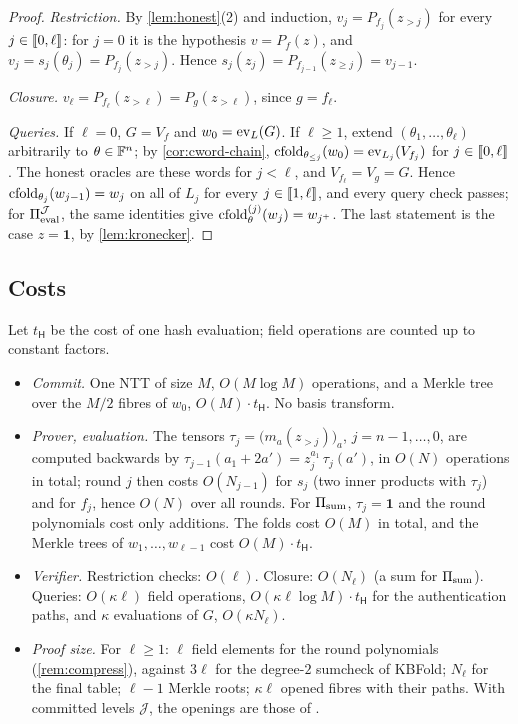 \begin{proof}
\emph{Restriction.} By \cref{lem:honest}(2) and induction, $v_j = P_{f_j}(z_{>j})$ for every $j \in \llbracket 0, \ell \rrbracket$: for $j = 0$ it is the hypothesis $v = P_f(z)$, and $v_j = s_j(\theta_j) = P_{f_j}(z_{>j})$. Hence $s_j(z_j) = P_{f_{j-1}}(z_{\ge j}) = v_{j-1}$.

\emph{Closure.} $v_\ell = P_{f_\ell}(z_{>\ell}) = P_g(z_{>\ell})$, since $g = f_\ell$.

\emph{Queries.} If $\ell = 0$, $G = V_f$ and $w_0 = \mathrm{ev}_L(G)$.
If $\ell \ge 1$, extend $(\theta_1,\dots,\theta_\ell)$ arbitrarily to $\theta \in \mathbb{F}^n$; by \cref{cor:cword-chain}, $\mathrm{cfold}_{\theta_{\le j}}(w_0) = \mathrm{ev}_{L_j}(V_{f_j})$ for $j \in \llbracket 0, \ell \rrbracket$.
The honest oracles are these words for $j < \ell$, and $V_{f_\ell} = V_g = G$.
Hence $\mathrm{cfold}_{\theta_j}(w_{j-1}) = w_j$ on all of $L_j$ for every $j \in \llbracket 1, \ell \rrbracket$, and every query check passes; for $\Pi_{\mathrm{eval}}^{\mathcal{J}}$, the same identities give $\mathrm{cfold}^{(j)}_\theta(w_j) = w_{j^+}$.
The last statement is the case $z = \mathbf 1$, by \cref{lem:kronecker}.
\end{proof}

\subsection{Costs}\label{sec:scheme:costs}

Let $t_{\mathsf{H}}$ be the cost of one hash evaluation; field operations are counted up to constant factors.

\begin{itemize}
  \item \emph{Commit.} One NTT of size $M$, $O(M \log M)$ operations, and a Merkle tree over the $M/2$ fibres of $w_0$, $O(M) \cdot t_{\mathsf{H}}$. No basis transform.
  \item \emph{Prover, evaluation.} The tensors $\tau_j = \bigl(m_a(z_{>j})\bigr)_a$, $j = n-1, \dots, 0$, are computed backwards by $\tau_{j-1}(a_1 + 2a') = z_j^{a_1}\, \tau_j(a')$, in $O(N)$ operations in total; round $j$ then costs $O(N_{j-1})$ for $s_j$ (two inner products with $\tau_j$) and for $f_j$, hence $O(N)$ over all rounds.
  For $\Pi_{\mathrm{sum}}$, $\tau_j = \mathbf 1$ and the round polynomials cost only additions.
  The folds cost $O(M)$ in total, and the Merkle trees of $w_1,\dots,w_{\ell-1}$ cost $O(M)\cdot t_{\mathsf{H}}$.
  \item \emph{Verifier.} Restriction checks: $O(\ell)$. Closure: $O(N_\ell)$ (a sum for $\Pi_{\mathrm{sum}}$). Queries: $O(\kappa\ell)$ field operations, $O(\kappa\ell\log M)\cdot t_{\mathsf{H}}$ for the authentication paths, and $\kappa$ evaluations of $G$, $O(\kappa N_\ell)$.
  \item \emph{Proof size.} For $\ell \ge 1$: $\ell$ field elements for the round polynomials (\cref{rem:compress}), against $3\ell$ for the degree-$2$ sumcheck of KBFold; $N_\ell$ for the final table; $\ell - 1$ Merkle roots; $\kappa\ell$ opened fibres with their paths. With committed levels $\mathcal{J}$, the openings are those of .
\end{itemize}


